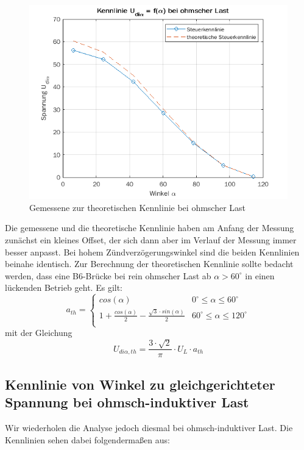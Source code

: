 \documentclass{article}
\begin{document}
\begin{figure}[h]
  \centering
  \includegraphics[width=.75\textwidth]{../assets/images/GEP2/udia_alpha_ohm.png}
  \caption{Gemessene zur theoretischen Kennlinie bei ohmscher Last}
  \label{fig:udiaalphaohm}
\end{figure}
Die gemessene und die theoretische Kennlinie haben am Anfang der Messung zunächst ein kleines Offset, der sich dann aber im Verlauf der Messung immer besser anpasst. Bei hohem Zündverzögerungswinkel sind die beiden Kennlinien beinahe identisch.
Zur Berechnung der theoretischen Kennlinie sollte bedacht werden, dass eine B6-Brücke bei rein ohmscher Last ab $\alpha > 60^{\circ}$ in einen lückenden Betrieb geht. Es gilt:
\begin{equation*}
  a_{th} = \begin{cases}
    cos(\alpha) & 0^{\circ}\leq\alpha\leq 60^{\circ}\\
    1 + \frac{cos(\alpha)}{2} - \frac{\sqrt{3}\cdot sin(\alpha)}{2} & 60^{\circ}\leq\alpha\leq 120^{\circ}\\
  \end{cases}
\end{equation*}
mit der Gleichung
\begin{equation}
  \label{eq:3}
  U_{di\alpha, th} = \frac{3\cdot\sqrt{2}}{\pi}\cdot U_{L}\cdot a_{th}
\end{equation}

\newpage
\subsection{Kennlinie von Winkel zu gleichgerichteter Spannung bei ohmsch-induktiver Last}
\label{sec:kennlinie-von-winkel-1}
Wir wiederholen die Analyse jedoch diesmal bei ohmsch-induktiver Last. Die Kennlinien sehen dabei folgendermaßen aus:
\end{document}
